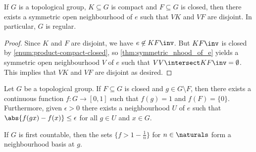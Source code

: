 \documentclass[article, a4paper, 11pt, oneside]{memoir}
\numberwithin{equation}{chapter}
\begin{document}
\begin{proposition}[Regularity]
    If $G$ is a topological group, $K \subseteq G$ is compact and $F \subseteq G$ is closed, then there exists a symmetric open neighbourhood of $e$ such that $VK$ and $VF$ are disjoint. In particular, $G$ is regular.
\end{proposition}

\begin{proof}
    Since $K$ and $F$ are disjoint, we have $e \not\in KF\inv$. But $KF\inv$ is closed by \cref{enum:product-compact-closed}, so \cref{thm:symmetric_nhood_of_e} yields a symmetric open neighbourhood $V$ of $e$ such that $VV \intersect KF\inv = \emptyset$. This implies that $VK$ and $VF$ are disjoint as desired.
\end{proof}



\begin{lemma}
    \label{lem:complete-regularity-lemma}
    Let $G$ be a topological group. If $F \subseteq G$ is closed and $g \in G \setminus F$, then there exists a continuous function $f \colon G \to [0,1]$ such that $f(g) = 1$ and $f(F) = \{0\}$. Furthermore, given $\epsilon > 0$ there exists a neighbourhood $U$ of $e$ such that $\abs{f(gx) - f(x)} \leq \epsilon$ for all $g \in U$ and $x \in G$.

    If $G$ is first countable, then the sets $\{f > 1 - \tfrac{1}{n}\}$ for $n \in \naturals$ form a neighbourhood basis at $g$.
\end{lemma} %
\end{document}

